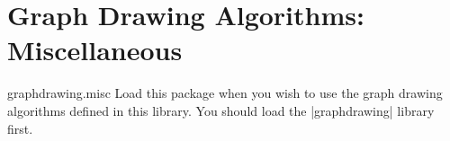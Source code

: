 %
%
%

\section{Graph Drawing Algorithms: Miscellaneous}
\label{section-last-graphdrawing-library-in-manual}


\begin{tikzlibrary}{graphdrawing.misc}
  Load this package when you wish to use the graph drawing algorithms
  defined in this library. You should load the |graphdrawing| library first.
\end{tikzlibrary}

\ifluatex\relax{}\expandafter\endinput\fi


